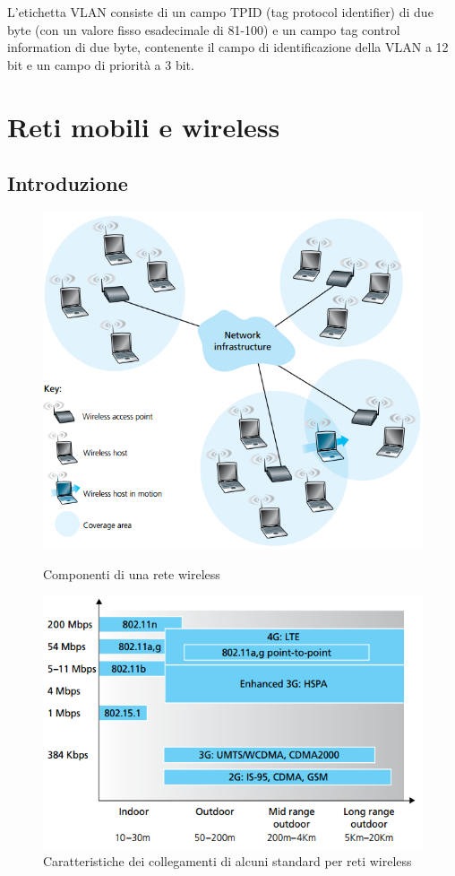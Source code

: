 \documentclass[11pt,a4paper]{article}
\begin{document}
L'etichetta VLAN consiste di un campo TPID (tag protocol identifier) di due byte (con un valore fisso esadecimale di 81-100) e un campo tag control information di due byte, contenente il campo di identificazione della VLAN a 12 bit e un campo di priorità a 3 bit.

\section{Reti mobili e wireless}
\subsection{Introduzione}
\begin{figure}
	\includegraphics[scale=0.6]{img/091.png}
	\caption{Componenti di una rete wireless}
	\label{fig: 091}
	\includegraphics[scale=0.6]{img/092.png}
	\caption{Caratteristiche dei collegamenti di alcuni standard per reti wireless}
	\label{fig: 092}
\end{figure}
\end{document}
